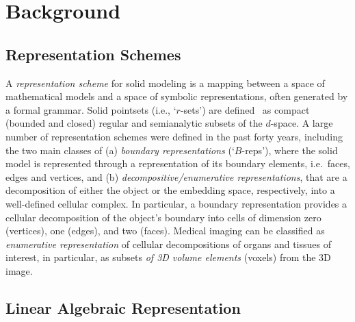 \section{Background}\label{sec:background}


\subsection{Representation Schemes}\label{sec:aaaa}

A \emph{representation scheme} for solid modeling is a mapping between a space of mathematical models and a space of symbolic representations, often generated by a formal grammar.
Solid pointsets (i.e., `$r$-sets') are defined~\cite{requicha:80} as compact (bounded and closed) regular and semianalytic subsets of the $d$-space. A large number of representation schemes were defined in the past forty years, including the two main classes of (a) \emph{boundary representations} (`$B$-reps'), where the solid model is represented through a representation of its boundary elements, i.e.~faces, edges and vertices, and (b) \emph{decompositive/enumerative representations}, that are a decomposition of either the object or the embedding space, respectively, into a well-defined cellular complex. In particular, a boundary representation provides a cellular decomposition of the object's boundary into cells of dimension zero (vertices), one (edges), and two (faces). Medical imaging can be classified as \emph{enumerative representation} of cellular decompositions of organs and tissues of interest, in particular, as subsets \emph{of 3D volume elements} (voxels) from the 3D image. 


\subsection{Linear Algebraic Representation}\label{sec:aaaa}

